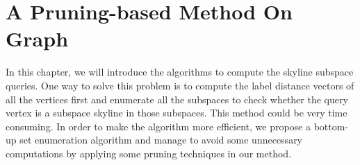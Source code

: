 
%
%

\chapter{A Pruning-based Method On Graph}
\label{ch:graph}

In this chapter, we will introduce the algorithms to compute the skyline subspace queries. One way to solve this problem is to compute the label distance vectors of all the vertices first and enumerate all the subspaces to check whether the query vertex is a subspace skyline in those subspaces. This method could be very time consuming. In order to make the algorithm more efficient, we propose a bottom-up set enumeration algorithm and manage to avoid some unnecessary computations by applying some pruning techniques in our method.

